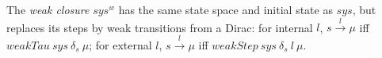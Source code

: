 \begin{definition}
  \label{def:weakclosure}
  \leanok
  The \emph{weak closure} $sys^w$ has the same state space and initial state as
  $sys$, but replaces its steps by weak transitions from a Dirac: for internal $l$,
  $s \xrightarrow{l} \mu$ iff $weakTau\ sys\ \delta_s\ \mu$; for external $l$,
  $s \xrightarrow{l} \mu$ iff $weakStep\ sys\ \delta_s\ l\ \mu$.
\end{definition}
